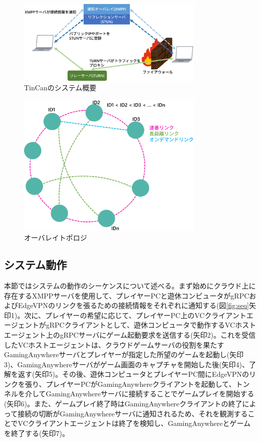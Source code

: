 \begin{figure}[t]
    \centering
    \includegraphics[width=0.8\textwidth,keepaspectratio,clip]{img/tincan.eps}
    \caption{TinCanのシステム概要}
    \label{fig:tincan}
\end{figure}

\begin{figure}[t]
    \centering
    \includegraphics[width=0.8\textwidth,keepaspectratio,clip]{img/overlay_topology.eps}
    \caption{オーバレイトポロジ}
    \label{fig:overlay}
\end{figure}

\subsection{システム動作}
本節ではシステムの動作のシーケンスについて述べる。まず始めにクラウド上に存在するXMPPサーバを使用して、プレイヤーPCと遊休コンピュータがgRPCおよびEdgeVPNのリンクを張るための接続情報をそれぞれに通知する(図\ref{fig:seq}矢印1)。次に、プレイヤーの希望に応じて、プレイヤーPC上のVCクライアントエージェントがgRPCクライアントとして、遊休コンピュータで動作するVCホストエージェント上のgRPCサーバにゲーム起動要求を送信する(矢印2)。これを受信したVCホストエージェントは、クラウドゲームサーバの役割を果たすGamingAnywhereサーバとプレイヤーが指定した所望のゲームを起動し(矢印3)、GamingAnywhereサーバがゲーム画面のキャプチャを開始した後(矢印4)、了解を返す(矢印5)。その後、遊休コンピュータとプレイヤーPC間にEdgeVPNのリンクを張り、プレイヤーPCがGamingAnywhereクライアントを起動して、トンネルを介してGamingAnywhereサーバに接続することでゲームプレイを開始する(矢印6)。また、ゲームプレイ終了時はGamingAnywhereクライアントの終了によって接続の切断がGamingAnywhereサーバに通知されるため、それを観測することでVCクライアントエージェントは終了を検知し、GamingAnywhereとゲームを終了する(矢印7)。

